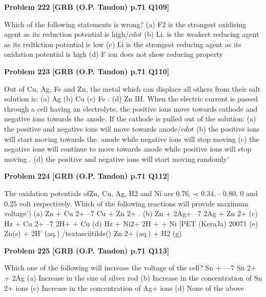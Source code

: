 \begin{problembox}
\textbf{Problem 222} \hfill \textbf{[GRB (O.P. Tandon) p.71 Q109]}
\label{q:ext-grb_all_questions-222}

Which of the following statements is wrong? 
(a) F2 is the strongest oxidising agent as its reduction potential 
is high$/cdot$ 
(b) Li. is the weakest reducing agent as its redtlction potential 
is low 
(c) Li is the strongest reducing agent as its oxidation potential 
is high 
(d) F 
ion does not show reducing property
\end{problembox}

\begin{problembox}
\textbf{Problem 223} \hfill \textbf{[GRB (O.P. Tandon) p.71 Q110]}
\label{q:ext-grb_all_questions-223}

Out of Cu, Ag, Fe and Zn, the metal which can displace all 
others from their salt solution is: 
(a) Ag 
(b) Cu 
(c) Fe : 
(d) Zn 
IH. When the electric current is passed through a cell having an 
electrolyte, the positive ions move towards cathode and 
negative ions towards the anode. If the cathode is pulled out of 
the solution: 
(a) the positive and negative ions will move towards anode$/cdot$ 
(b) the positive ions will start moving towards the. anode 
while negative ions will stop moving 
(c) the negative ions will continue to move towards anode 
while positive ions will stop moving 
. (d) the positive and negative ions will start moving randomly'
\end{problembox}

\begin{problembox}
\textbf{Problem 224} \hfill \textbf{[GRB (O.P. Tandon) p.71 Q112]}
\label{q:ext-grb_all_questions-224}

The oxidation potentials ofZn, Cu, Ag, H2 and Ni are 0.76, 
-c 0.34, - 0.80, 0 and 0.25 volt respectively. Which of the 
following reactions will provide maximum voltage') 
(a) Zn + Cu 2+ --7 Cu + Zn 2+ . 
(b) Zn + 2Ag+ --7 2Ag + Zn 2+ 
(c) Hz + Cu 2+ --7 2H+ + Cu 
(d) Hz + Ni2+ 
2H + + Ni 
[PET (KeraJa) 20071 
(e) Zn(s) + 2H' (aq.) /textasciitilde() 
Zn 2+ (aq.) + H2 (g)
\end{problembox}

\begin{problembox}
\textbf{Problem 225} \hfill \textbf{[GRB (O.P. Tandon) p.71 Q113]}
\label{q:ext-grb_all_questions-225}

Which one of the following will increase the voltage of the 
cell? 
Sn + 
---7 Sn 2+ + 2Ag 
(a) Increase in the size of silver rod 
(b) Increase in the concentration of Sn 2+ ions \underline{\hspace{1cm}} 
(c) Increase in the concentration of Ag+ ions 
(d) None of the above
\end{problembox}

